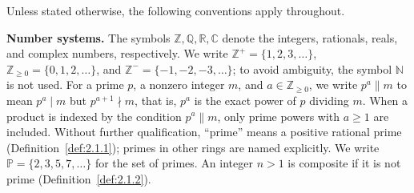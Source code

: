 \documentclass[11pt]{article}
\theoremstyle{ntstyle}
\newcommand{\Primes}{\mathbb{P}}
\begin{document}
\medskip
\noindent Unless stated otherwise, the following conventions apply throughout.

\noindent \textbf{Number systems.} The symbols $\mathbb{Z},\mathbb{Q},\mathbb{R},\mathbb{C}$ denote the integers,
rationals, reals, and complex numbers, respectively. We write $\mathbb{Z}^+=\{1,2,3,\ldots\}$,
$\mathbb{Z}_{\ge0}=\{0,1,2,\ldots\}$, and $\mathbb{Z}^-=\{-1,-2,-3,\ldots\}$; to avoid ambiguity, the symbol
$\mathbb{N}$ is not used. For a prime $p$, a nonzero integer $m$, and $a\in\mathbb{Z}_{\ge0}$, we write
$p^{a}\parallel m$ to mean $p^{a}\mid m$ but $p^{a+1}\nmid m$, that is, $p^{a}$ is the exact power of $p$ dividing
$m$. When a product is indexed by the condition $p^a\parallel m$, only prime powers with $a\ge1$ are included.
Without further qualification, ``prime'' means a positive rational prime (Definition~\ref{def:2.1.1}); primes in
other rings are named explicitly. We write $\Primes=\{2,3,5,7,\ldots\}$ for the set of primes. An integer $n>1$ is
composite if it is not prime (Definition~\ref{def:2.1.2}).
\end{document}
